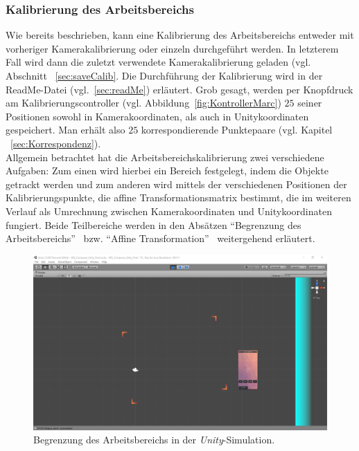 \subsubsection{Kalibrierung des Arbeitsbereichs}\label{sec:planeCalib} 
Wie bereits beschrieben, kann eine Kalibrierung des Arbeitsbereichs entweder mit vorheriger Kamerakalibrierung oder einzeln durchgeführt werden. In letzterem Fall wird dann die zuletzt verwendete Kamerakalibrierung geladen (vgl. Abschnitt ~\ref{sec:saveCalib}. Die Durchführung der Kalibrierung wird in der ReadMe-Datei (vgl.~\ref{sec:readMe}) erläutert. Grob gesagt, werden per Knopfdruck am Kalibrierungscontroller (vgl. Abbildung~\ref{fig:KontrollerMarc}) $25$ seiner Positionen sowohl in Kamerakoordinaten, als auch in Unitykoordinaten gespeichert. Man erhält also $25$ korrespondierende Punktepaare (vgl. Kapitel ~\ref{sec:Korrespondenz}).\\
Allgemein betrachtet hat die Arbeitsbereichskalibrierung zwei verschiedene Aufgaben: Zum einen wird hierbei ein Bereich festgelegt, indem die Objekte getrackt werden und zum anderen wird mittels der verschiedenen Positionen der Kalibrierungspunkte, die affine Transformationsmatrix bestimmt, die im weiteren Verlauf als Umrechnung zwischen Kamerakoordinaten und Unitykoordinaten fungiert. Beide Teilbereiche werden in den Absätzen "`Begrenzung des Arbeitsbereichs"' ~bzw. "`Affine Transformation"' ~weitergehend erläutert.

\begin{figure}
	\centering
	\includegraphics[width=\textwidth, trim=7cm 2cm 5cm 6cm, clip]{Bilder/Neue Screenshots/Arbeitsbereich.PNG}
	\caption{Begrenzung des Arbeitsbereichs in der \emph{Unity}-Simulation.}
	\label{fig:begrenzungArbeitsbereich}
\end{figure}

